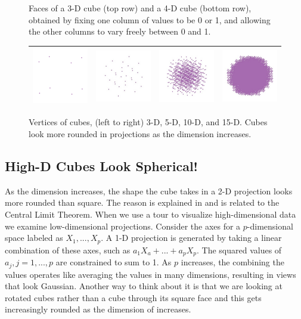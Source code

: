 \begin{figure}[ht]
  \caption{Faces of a 3-D cube (top row) and a 4-D cube (bottom row), obtained by fixing one column of values to be 0 or 1, and allowing the other columns to vary freely between 0 and 1.}
  \label{faces}
\end{figure}

\begin{figure}[ht]
\centering
\begin{tabular}{|c|c|c|c|}
\hline
\includegraphics[width=1in]{fig/cube-3-vert.pdf} & \includegraphics[width=1in]{fig/cube-5-vert.pdf} &
\includegraphics[width=1in]{fig/cube-10-vert.pdf} & \includegraphics[width=1in]{fig/cube-15-vert.pdf} \\
\hline
\end{tabular}
\caption{Vertices of cubes, (left to right) 3-D, 5-D, 10-D, and 15-D. Cubes look more
  rounded in projections as the dimension increases.}
\end{figure}

\subsection{High-D Cubes Look Spherical!}

As the dimension increases, the shape the cube takes in a 2-D
projection looks more rounded than square. The reason is explained in
\citet{DF84} and is related to the Central Limit Theorem. When we use
a tour to visualize high-dimensional data we examine low-dimensional
projections.  Consider the axes for a $p$-dimensional space labeled as
$X_1, ..., X_p$. A 1-D projection is generated by taking a linear
combination of these axes, such as $a_1X_a+...+a_pX_p$. The squared
values of $a_j, j=1, ..., p$ are constrained to sum to 1. As $p$
increases, the combining the values operates like averaging the values
in many dimensions, resulting in views that look Gaussian. Another way
to think about it is that we are looking at rotated cubes rather than
a cube through its square face and this gets increasingly rounded as
the dimension of increases.


